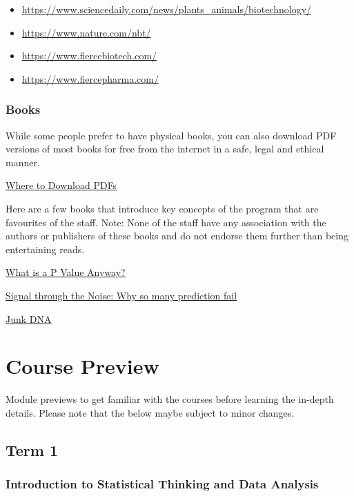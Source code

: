 \documentclass[
]{book}
\providecommand{\tightlist}{%
  \setlength{\itemsep}{0pt}\setlength{\parskip}{0pt}}
\begin{document}
\begin{itemize}
\tightlist
\item
  \url{https://www.sciencedaily.com/news/plants_animals/biotechnology/}
\item
  \url{https://www.nature.com/nbt/}
\item
  \url{https://www.fiercebiotech.com/}
\item
  \url{https://www.fiercepharma.com/}
\end{itemize}

\subsection{Books}\label{books}

While some people prefer to have physical books, you can also download PDF versions of most books for free from the internet in a safe, legal and ethical manner.

\href{https://www.pdfreaderpro.com/blog/download-free-pdf-books}{Where to Download PDFs}

Here are a few books that introduce key concepts of the program that are favourites of the staff. Note: None of the staff have any association with the authors or publishers of these books and do not endorse them further than being entertaining reads.

\href{https://www.abebooks.co.uk/9780321629302/What-p-value-anyway-Stories-Help-0321629302/plp}{What is a P Value Anyway?}

\href{https://www.amazon.co.uk/Signal-Noise-Many-Predictions-Fail-But/dp/0143125087}{Signal through the Noise: Why so many prediction fail}

\href{https://www.amazon.co.uk/Junk-DNA-Journey-Through-Matter/dp/1848319150}{Junk DNA}

\chapter{Course Preview}\label{course-preview}

Module previews to get familiar with the courses before learning the in-depth details. Please note that the below maybe subject to minor changes.

\section*{Term 1}\label{term-1}

\subsection*{Introduction to Statistical Thinking and Data Analysis}\label{introduction-to-statistical-thinking-and-data-analysis}
\end{document}
